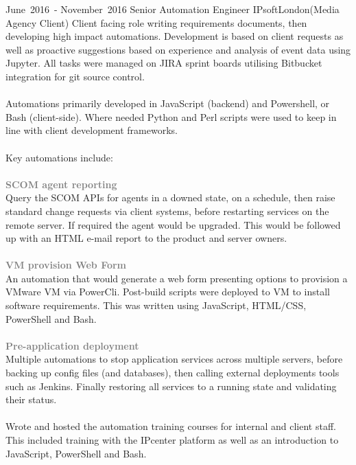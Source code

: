 \cventry %
  {\mbox{June 2016 -} \mbox{November 2016}}
  {Senior Automation Engineer}
  {IPsoft}{London}{(Media Agency Client)}
  {
    Client facing role writing requirements documents, then developing high impact automations. 
    Development is based on client requests as well as proactive suggestions based on experience 
    and analysis of event data using Jupyter.  All tasks were managed on JIRA sprint boards utilising 
    Bitbucket integration for git source control.\\~\\
    Automations primarily developed in JavaScript (backend) and Powershell, or Bash (client-side). 
    Where needed Python and Perl scripts were used to keep in line with client development frameworks.\\~\\
    Key automations include:\\\\
    \textcolor{gray}{\textbf{SCOM agent reporting}}\\
    Query the SCOM APIs for agents in a downed state, on a schedule, 
    then raise standard change requests via client systems, before restarting services on 
    the remote server. If required the agent would be upgraded. This would be followed up 
    with an HTML e-mail report to the product and server owners.\\\\
    \textcolor{gray}{\textbf{VM provision Web Form}}\\
    An automation that would generate a web form presenting options 
    to provision a VMware VM via PowerCli. Post-build scripts were deployed to VM to install 
    software requirements. This was written using JavaScript, HTML/CSS, PowerShell and Bash.\\\\
    \textcolor{gray}{\textbf{Pre-application deployment}}\\
    Multiple automations to stop application services across 
    multiple servers, before backing up config files (and databases), then calling external 
    deployments tools such as Jenkins. Finally restoring all services to a running 
    state and validating their status.\\\\
    Wrote and hosted the automation training courses for internal and client staff. This included 
    training with the IPcenter platform as well as an introduction to JavaScript, PowerShell and Bash.\\
  }

